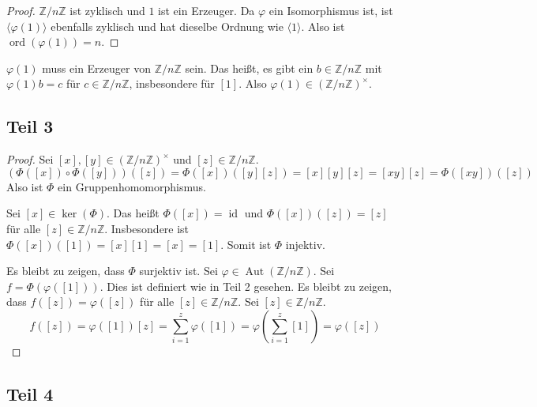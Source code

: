\documentclass[10pt,a4paper]{article}
\DeclareMathOperator{\id}{id}
\DeclareMathOperator{\ord}{ord}
\DeclareMathOperator{\Aut}{Aut}
\begin{document}
\begin{proof}
  $\mathbb{Z} / n \mathbb{Z}$ ist zyklisch und $1$ ist ein Erzeuger.
  Da $\varphi$ ein Isomorphismus ist, ist $\langle \varphi(1) \rangle$ ebenfalls zyklisch und hat dieselbe Ordnung wie $\langle 1 \rangle$.
  Also ist $\ord(\varphi(1)) = n$.
\end{proof}

$\varphi(1)$ muss ein Erzeuger von $\mathbb{Z} / n \mathbb{Z}$ sein.
Das heißt, es gibt ein $b \in \mathbb{Z} / n \mathbb{Z}$ mit $\varphi(1)b = c$ für $c \in \mathbb{Z} / n \mathbb{Z}$, insbesondere für $[1]$.
Also $\varphi(1) \in (\mathbb{Z} / n \mathbb{Z})^{\times}$.

\subsection{Teil 3}

\begin{proof}
  Sei $[x], [y] \in (\mathbb{Z} / n \mathbb{Z})^{\times}$ und $[z] \in \mathbb{Z} / n \mathbb{Z}$.
  \begin{equation}
    (\varPhi([x]) \circ  \varPhi([y]))([z]) = \varPhi([x])([y][z]) = [x][y][z] = [xy][z] = \varPhi([xy])([z])
  \end{equation}
  Also ist $\varPhi$ ein Gruppenhomomorphismus.

  Sei $[x] \in \ker(\varPhi)$.
  Das heißt $\varPhi([x]) = \id$ und $\varPhi([x])([z]) = [z]$ für alle $[z] \in \mathbb{Z} / n \mathbb{Z}$.
  Insbesondere ist $\varPhi([x])([1]) = [x][1] = [x] = [1]$.
  Somit ist $\varPhi$ injektiv.

  Es bleibt zu zeigen, dass $\varPhi$ surjektiv ist.
  Sei $\varphi \in \Aut(\mathbb{Z} / n \mathbb{Z})$.
  Sei $f = \varPhi(\varphi([1]))$.
  Dies ist definiert wie in Teil 2 gesehen.
  Es bleibt zu zeigen, dass $f([z]) = \varphi([z])$ für alle $[z] \in \mathbb{Z} / n \mathbb{Z}$.
  Sei $[z] \in \mathbb{Z} / n \mathbb{Z}$.
  \begin{equation}
    f([z]) = \varphi([1])[z] = \sum_{i = 1}^{z} \varphi([1]) = \varphi(\sum_{i = 1}^{z} [1]) = \varphi([z])
  \end{equation}
\end{proof}

\subsection{Teil 4}
\end{document}
